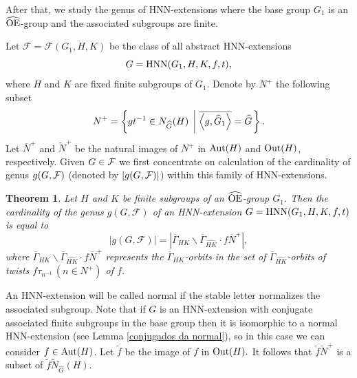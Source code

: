 \documentclass[a4paper,12pt]{article}
\newtheorem{thm}{Theorem}[section]
\newcommand{\Oe}{\rm \widehat{OE}}
\newcommand{\F}{{\cal F}}
\def\aut {{\rm Aut}}
\def\out {{\rm Out}}
\def\hnn {{\rm HNN}}
\begin{document}
After that, we study the genus of HNN-extensions where the base group $G_1$ is an $\rm \Oe$-group and the associated subgroups are finite. 


\medskip
Let $\mathcal{F}=\mathcal F(G_1,H,K)$ be the class of all 
abstract HNN-extensions $$G=\hnn(G_1, H, K, f, t),$$ where $H$ and $K$ are fixed finite subgroups of $G_1$. Denote by $N^+$  the following subset  
  \begin{equation*} %
N^+=\left\{ gt^{-1} \in N_{\widehat G}(H) \hspace{0.1cm} \left| \hspace{0.1cm}  \overline{\left\langle g, \widehat G_1 \right\rangle}=\widehat G \right. \right\}.   
\end{equation*} 
Let $\overline{N}^{+}$ and $\widetilde{N}^{+}$ be the natural images of $N^{+}$ in $\aut(H)$ and $\out(H)$, respectively. Given $G\in \F$ we first concentrate on calculation of the cardinality of genus $g(G,\F)$ (denoted by $|g(G, \F)|$)  within this family of HNN-extensions. 


\begin{thm} Let $H$ and $K$ be finite subgroups of an $\Oe$-group $G_1$. Then the cardinality of the genus $g(G, \mathcal{F})$ of an HNN-extension $G=\hnn(G_1,H,K,f,t)$ is equal to $$|g(G, \mathcal{F})| = \left|\overline\Gamma_{HK}  \backslash \overline\Gamma_{\widehat{HK}}  \cdot  f \overline{N}^+\right|,$$ where $\overline\Gamma_{HK}  \backslash \overline\Gamma_{\widehat{HK}}  \cdot f\overline{N}^+$ represents the $\overline\Gamma_{HK}$-orbits in the set of   $\overline\Gamma_{\widehat{HK}}$-orbits of twists $f\tau_{n^{-1}}\,(n \in N^{+})$ of $f$. 
\end{thm}



An HNN-extension will be called normal if the stable letter normalizes the associated subgroup. Note that if $G$ is an HNN-extension with conjugate associated finite subgroups  in the base group then it is isomorphic to a normal HNN-extension (see Lemma \ref{conjugados da normal}), so in this case we can consider $f \in \aut(H)$. Let $\tilde f$ be the image of $f$ in $\out(H).$ It follows that $\tilde{f}\widetilde{N}^+$ is a subset of $\tilde f \widetilde{N}_{\widehat G}(H)$.
\end{document}
